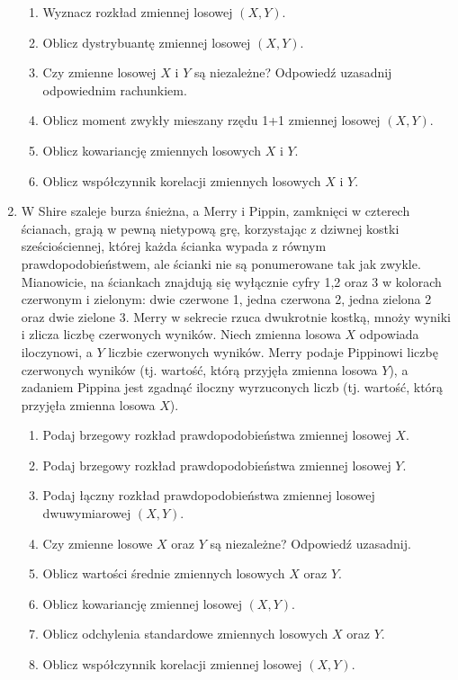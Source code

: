 \documentclass[twoside]{mwart}
\newcommand{\ans}[1]{}
\newenvironment{ansenv}{\comment}{\endcomment}
\newenvironment{ansenv}{\paragraph{Odpowiedź:}}{}
\newcommand{\ans}[1]{\begin{ansenv}#1\end{ansenv}}
\begin{document}
\begin{enumerate}
\begin{enumerate}
\item Wyznacz rozkład zmiennej losowej $(X,Y)$. \ans{$P(0,0)=\frac{39}{52} P(1,0)=0 P(0,1)=\frac{12}{52} P(1,1)=\frac{1}{52}$}
\item Oblicz dystrybuantę zmiennej losowej $(X,Y)$.
\item Czy zmienne losowej $X$ i $Y$ są niezależne? Odpowiedź uzasadnij odpowiednim rachunkiem. \ans{Nie, $0=P(1,0)\neq P(X=1)P(Y=0)=\frac{39}{52^2}$}
\item Oblicz moment zwykły mieszany rzędu 1+1 zmiennej losowej $(X,Y)$. \ans{$EXY=\frac{1}{52}$}
\item Oblicz kowariancję zmiennych losowych $X$ i $Y$.
\item Oblicz współczynnik korelacji zmiennych losowych $X$ i $Y$.
\end{enumerate}

\item W Shire szaleje burza śnieżna, a Merry i Pippin, zamknięci w czterech ścianach, grają w pewną nietypową grę, korzystając z dziwnej kostki sześciościennej, której każda ścianka wypada z równym prawdopodobieństwem, ale ścianki nie są ponumerowane tak jak zwykle.
Mianowicie, na ściankach znajdują się wyłącznie cyfry 1,2 oraz 3 w kolorach czerwonym i zielonym: dwie czerwone 1, jedna czerwona 2, jedna zielona 2 oraz dwie zielone 3.
Merry w sekrecie rzuca dwukrotnie kostką, mnoży wyniki i zlicza liczbę czerwonych wyników.
Niech zmienna losowa $X$ odpowiada iloczynowi, a $Y$ liczbie czerwonych wyników.
Merry podaje Pippinowi liczbę czerwonych wyników (tj. wartość, którą przyjęła zmienna losowa $Y$), a zadaniem Pippina jest zgadnąć iloczny wyrzuconych liczb (tj. wartość, którą przyjęła zmienna losowa $X$).

\begin{enumerate}
	\item Podaj brzegowy rozkład prawdopodobieństwa zmiennej losowej $X$. 
	\item Podaj brzegowy rozkład prawdopodobieństwa zmiennej losowej $Y$. 
	\item Podaj łączny rozkład prawdopodobieństwa zmiennej losowej dwuwymiarowej $(X,Y)$. 
	\item Czy zmienne losowe $X$ oraz $Y$ są niezależne? Odpowiedź uzasadnij.
	\item Oblicz wartości średnie zmiennych losowych $X$ oraz $Y$.
	\item Oblicz kowariancję zmiennej losowej $(X,Y)$.
	\item Oblicz odchylenia standardowe zmiennych losowych $X$ oraz $Y$.
	\item Oblicz współczynnik korelacji zmiennej losowej $(X,Y)$.
\end{enumerate}


\end{enumerate}
\end{document}
